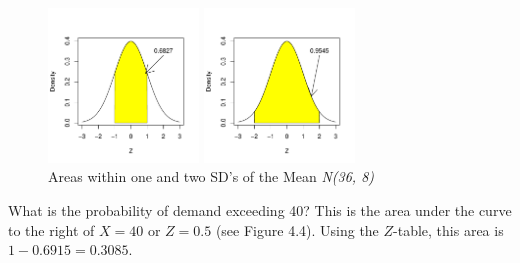 \documentclass[11pt, chapterprefix=true]{scrbook}\usepackage[]{graphicx}\usepackage[]{color}
\begin{document}
\begin{figure}[ht]

\caption{Areas within one and two SD's of the Mean \textit{N(36, 8)}}

\begin{minipage}[ht]{7cm}



{\centering \includegraphics[width=4cm]{figure/LBL4c1-1} 

}



\end{minipage}
\begin{minipage}[ht]{7cm}


{\centering \includegraphics[width=4cm]{figure/LBL4c2-1} 

}



\end{minipage}
\end{figure}

What is the probability of demand exceeding 40?  This is the area under the curve to the right of $X = 40$ or $Z = 0.5$ (see Figure 4.4).  Using the $Z$-table, this area is $1 -  0.6915 = 0.3085$.
\end{document}
